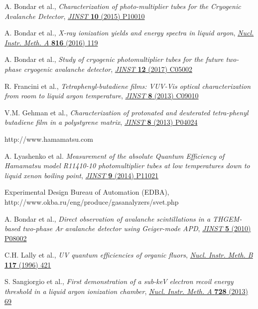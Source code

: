 \documentclass[a4paper,11pt]{article}
\begin{document}
\begin{thebibliography}{99}
A. Bondar et al., \emph{Characterization of photo-multiplier tubes for the Cryogenic Avalanche Detector}, \href{http://dx.doi.org/10.1088/1748-0221/10/10/P10010}{\emph{JINST} {\bf 10} (2015) P10010}

A. Bondar et al., \emph{X-ray ionization yields and energy spectra in liquid argon}, \href{http://dx.doi.org/10.1016/j.nima.2016.02.010}{\emph{Nucl. Instr. Meth. A} {\bf 816} (2016) 119}

A. Bondar et al., \emph{Study of cryogenic photomultiplier tubes for the future two-phase cryogenic avalanche detector}, \href{http://dx.doi.org/10.1088/1748-0221/12/05/C05002}{\emph{JINST} {\bf 12} (2017) C05002}

R. Francini et al., \emph{Tetraphenyl-butadiene films: VUV-Vis optical characterization from room to liquid argon temperature}, \href{https://doi.org/10.1088/1748-0221/8/09/C09010}{\emph{JINST} {\bf 8} (2013) C09010}

V.M. Gehman et al., \emph{Characterization of protonated and deuterated tetra-phenyl butadiene film in a polystyrene matrix}, \href{https://doi.org/10.1088/1748-0221/8/04/P04024}{\emph{JINST} {\bf 8} (2013) P04024}

http://www.hamamatsu.com

A. Lyashenko et al.	 \emph{Measurement of the absolute Quantum Efficiency of Hamamatsu model R11410-10 photomultiplier tubes at low temperatures down to liquid xenon boiling point}, \href{https://doi.org/10.1088/1748-0221/9/11/P11021} {\emph{JINST} {\bf 9} (2014) P11021}

Experimental Design Bureau of Automation (EDBA), http://www.okba.ru/eng/produce/gasanalyzers/svet.php

A. Bondar et al., \emph{Direct observation of avalanche scintillations in a THGEM-based two-phase Ar avalanche detector using Geiger-mode APD}, \href{https://doi.org/10.1088/1748-0221/5/08/P08002}{\emph{JINST} {\bf 5} (2010) P08002}

C.H. Lally et al., \emph{UV quantum efficiencies of organic fluors}, \href{https://doi.org/10.1016/0168-583X(96)00318-7}{\emph{Nucl. Instr. Meth. B} {\bf 117} (1996) 421}

S. Sangiorgio et al., \emph{First demonstration of a sub-keV electron recoil energy threshold in a liquid argon ionization chamber}, \href{https://doi.org/10.1016/j.nima.2013.06.061}{\emph{Nucl. Instr. Meth. A} {\bf 728} (2013) 69}




\end{thebibliography}
\end{document}
